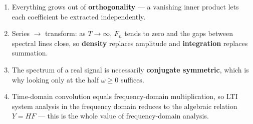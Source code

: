 \begin{enumerate}
    \item Everything grows out of \textbf{orthogonality} --- a vanishing inner
          product lets each coefficient be extracted independently.
    \item Series $\to$ transform: as $T\to\infty$, $F_n$ tends to zero and the
          gaps between spectral lines close, so \textbf{density} replaces
          amplitude and \textbf{integration} replaces summation.
    \item The spectrum of a real signal is necessarily \textbf{conjugate
          symmetric}, which is why looking only at the half $\omega\ge0$
          suffices.
    \item Time-domain convolution equals frequency-domain multiplication, so
          LTI system analysis in the frequency domain reduces to the algebraic
          relation $Y=HF$ --- this is the whole value of frequency-domain
          analysis.
\end{enumerate}


